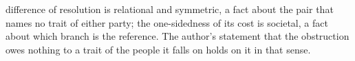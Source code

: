 difference of resolution is relational and symmetric, a fact about the pair that names no trait of either party; the one-sidedness of its cost is societal, a fact about which branch is the reference. The author's statement that the obstruction owes nothing to a trait of the people it falls on holds on it in that sense.
